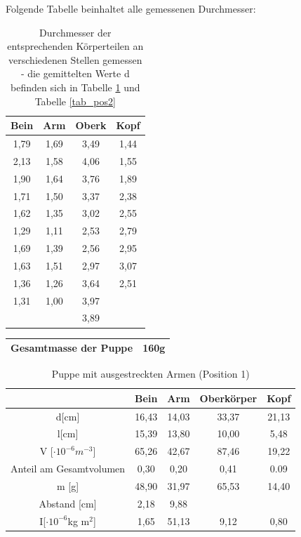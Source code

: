 Folgende Tabelle beinhaltet alle gemessenen Durchmesser:
\begin{table}[H]
\begin{tabular}{|c|c|c|c|}
\hline 
Bein&	Arm	&Oberk	&Kopf	\\ \hline
1,79&	1,69&	3,49&	1,44\\ \hline
2,13&	1,58&	4,06&	1,55\\ \hline
1,90&	1,64&	3,76&	1,89\\ \hline
1,71&	1,50&	3,37&	2,38\\ \hline
1,62&	1,35&	3,02&	2,55\\ \hline
1,29&	1,11&	2,53&	2,79\\ \hline
1,69&	1,39&	2,56&	2,95\\ \hline
1,63&	1,51&	2,97&	3,07\\ \hline
1,36&	1,26&	3,64&	2,51\\ \hline
1,31&	1,00&	3,97&		\\ \hline
	&	&		3,89		&		\\ \hline
\end{tabular}
\caption{Durchmesser der entsprechenden Körperteilen an verschiedenen Stellen gemessen - die gemittelten Werte d befinden sich in Tabelle \ref{tab_pos1} und Tabelle \ref{tab_pos2}}
\end{table}
\begin{table}[H]
\begin{tabular}{|c|c|}
\hline
Gesamtmasse der Puppe & 160g \\ \hline
\end{tabular} 
\end{table}

\begin{table}[H]
\begin{tabular}{|c|c|c|c|c|}
\hline 		
&	Bein&	Arm	&Oberkörper	&Kopf	\\ \hline	
d[cm]&	16,43	&14,03&	33,37&	21,13		\\ \hline		
l[cm]&	15,39&	13,80&	10,00	&5,48\\ \hline
V [$\cdot 10^{-6}m^{-3}$]& 65,26&	42,67	&87,46&	19,22\\ \hline		
Anteil am Gesamtvolumen&	0,30	&0,20&	0,41&	0.09\\ \hline
m [g]&	48,90&	31,97	&65,53&	14,40\\ \hline
Abstand [cm] & 2,18	& 9,88	&&\\ \hline	
I[$\cdot 10^{-6}$kg m$^2$]&1,65&	51,13&	9,12&	0,80\\ \hline
\end{tabular} 
\caption{Puppe mit ausgestreckten Armen (Position 1)}
\label{tab_pos1}
\end{table}

